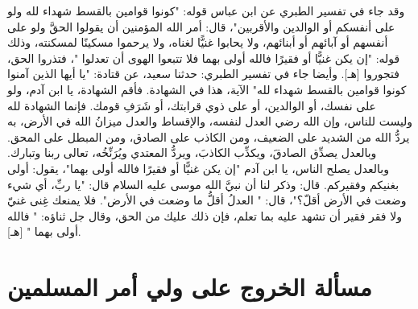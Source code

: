 وقد جاء في تفسير الطبري عن ابن عباس قوله: "كونوا قوامين بالقسط شهداء لله ولو على أنفسكم أو الوالدين والأقربين"، قال: أمر الله المؤمنين أن يقولوا الحقَّ ولو على أنفسهم أو آبائهم أو أبنائهم، ولا يحابوا غنيًّا لغناه، ولا يرحموا مسكينًا لمسكنته، وذلك قوله: "إن يكن غنيًّا أو فقيرًا فالله أولى بهما فلا تتبعوا الهوى أن تعدلوا "، فتذروا الحق، فتجوروا [هـ]. وأيضا جاء في تفسير الطبري: حدثنا سعيد، عن قتادة: "يا أيها الذين آمنوا كونوا قوامين بالقسط شهداء لله" الآية، هذا في الشهادة. فأقم الشهادة، يا ابن آدم، ولو على نفسك، أو الوالدين، أو على ذوي قرابتك، أو شَرَفِ قومك. فإنما الشهادة لله وليست للناس، وإن الله رضي العدل لنفسه، والإقساط والعدل ميزانُ الله في الأرض، به يردُّ الله من الشديد على الضعيف، ومن الكاذب على الصادق، ومن المبطل على المحق. وبالعدل يصدِّق الصادقَ، ويكذِّب الكاذبَ، ويردُّ المعتدي ويُرَنِّخُه، تعالى ربنا وتبارك. وبالعدل يصلح الناس، يا ابن آدم "إن يكن غنيًّا أو فقيرًا فالله أولى بهما"، يقول: أولى بغنيكم وفقيركم. قال: وذكر لنا أن نبيَّ الله موسى عليه السلام قال: "يا ربِّ، أي شيء وضعت في الأرض أقلّ؟"، قال: " العدلُ أقلُّ ما وضعت في الأرض". فلا يمنعك غِنى غنيّ ولا فقر فقير أن تشهد عليه بما تعلم، فإن ذلك عليك من الحق، وقال جل ثناؤه: " فالله أولى بهما " [هـ].

\section{مسألة الخروج على ولي أمر المسلمين}
\label{sec:app_rebellion}

